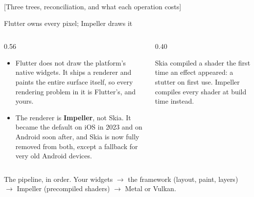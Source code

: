 \documentclass[10pt,aspectratio=169,t]{beamer}
\begin{document}
[Three trees, reconciliation, and what each operation costs]

\begin{frame}[eyebrow=Rendering]{Flutter owns every pixel; Impeller draws it}
  \begin{columns}[T]
    \begin{column}{0.56\textwidth}
      \begin{itemize}
        \item Flutter does not draw the platform's native widgets. It ships a renderer and paints the entire surface itself, so every rendering problem in it is Flutter's, and yours.
        \item The renderer is \textbf{Impeller}, not Skia. It became the default on iOS in 2023 and on Android soon after, and Skia is now fully removed from both, except a fallback for very old Android devices.
      \end{itemize}
    \end{column}
    \begin{column}{0.40\textwidth}
      \begin{hint}
        Skia compiled a shader the first time an effect appeared: a stutter on first use. Impeller compiles every shader at build time instead.
      \end{hint}
    \end{column}
  \end{columns}
  \begin{takeaway}{The pipeline, in order.}
    Your widgets \(\rightarrow\) the framework (layout, paint, layers) \(\rightarrow\) Impeller (precompiled shaders) \(\rightarrow\) Metal or Vulkan.
  \end{takeaway}
\end{frame}
\end{document}
